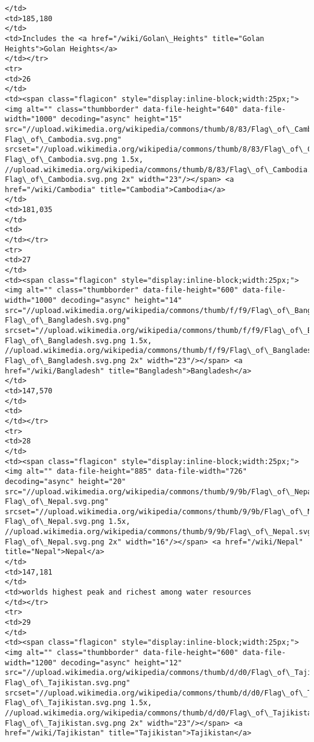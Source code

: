\documentclass[11pt]{article}
\begin{document}
\begin{Verbatim}[commandchars=\\\{\}]
</td>
<td>185,180
</td>
<td>Includes the <a href="/wiki/Golan\_Heights" title="Golan Heights">Golan Heights</a>
</td></tr>
<tr>
<td>26
</td>
<td><span class="flagicon" style="display:inline-block;width:25px;"><img alt="" class="thumbborder" data-file-height="640" data-file-width="1000" decoding="async" height="15" src="//upload.wikimedia.org/wikipedia/commons/thumb/8/83/Flag\_of\_Cambodia.svg/23px-Flag\_of\_Cambodia.svg.png" srcset="//upload.wikimedia.org/wikipedia/commons/thumb/8/83/Flag\_of\_Cambodia.svg/35px-Flag\_of\_Cambodia.svg.png 1.5x, //upload.wikimedia.org/wikipedia/commons/thumb/8/83/Flag\_of\_Cambodia.svg/46px-Flag\_of\_Cambodia.svg.png 2x" width="23"/></span> <a href="/wiki/Cambodia" title="Cambodia">Cambodia</a>
</td>
<td>181,035
</td>
<td>
</td></tr>
<tr>
<td>27
</td>
<td><span class="flagicon" style="display:inline-block;width:25px;"><img alt="" class="thumbborder" data-file-height="600" data-file-width="1000" decoding="async" height="14" src="//upload.wikimedia.org/wikipedia/commons/thumb/f/f9/Flag\_of\_Bangladesh.svg/23px-Flag\_of\_Bangladesh.svg.png" srcset="//upload.wikimedia.org/wikipedia/commons/thumb/f/f9/Flag\_of\_Bangladesh.svg/35px-Flag\_of\_Bangladesh.svg.png 1.5x, //upload.wikimedia.org/wikipedia/commons/thumb/f/f9/Flag\_of\_Bangladesh.svg/46px-Flag\_of\_Bangladesh.svg.png 2x" width="23"/></span> <a href="/wiki/Bangladesh" title="Bangladesh">Bangladesh</a>
</td>
<td>147,570
</td>
<td>
</td></tr>
<tr>
<td>28
</td>
<td><span class="flagicon" style="display:inline-block;width:25px;"><img alt="" data-file-height="885" data-file-width="726" decoding="async" height="20" src="//upload.wikimedia.org/wikipedia/commons/thumb/9/9b/Flag\_of\_Nepal.svg/16px-Flag\_of\_Nepal.svg.png" srcset="//upload.wikimedia.org/wikipedia/commons/thumb/9/9b/Flag\_of\_Nepal.svg/25px-Flag\_of\_Nepal.svg.png 1.5x, //upload.wikimedia.org/wikipedia/commons/thumb/9/9b/Flag\_of\_Nepal.svg/33px-Flag\_of\_Nepal.svg.png 2x" width="16"/></span> <a href="/wiki/Nepal" title="Nepal">Nepal</a>
</td>
<td>147,181
</td>
<td>worlds highest peak and richest among water resources
</td></tr>
<tr>
<td>29
</td>
<td><span class="flagicon" style="display:inline-block;width:25px;"><img alt="" class="thumbborder" data-file-height="600" data-file-width="1200" decoding="async" height="12" src="//upload.wikimedia.org/wikipedia/commons/thumb/d/d0/Flag\_of\_Tajikistan.svg/23px-Flag\_of\_Tajikistan.svg.png" srcset="//upload.wikimedia.org/wikipedia/commons/thumb/d/d0/Flag\_of\_Tajikistan.svg/35px-Flag\_of\_Tajikistan.svg.png 1.5x, //upload.wikimedia.org/wikipedia/commons/thumb/d/d0/Flag\_of\_Tajikistan.svg/46px-Flag\_of\_Tajikistan.svg.png 2x" width="23"/></span> <a href="/wiki/Tajikistan" title="Tajikistan">Tajikistan</a>

\end{Verbatim}
\end{document}
